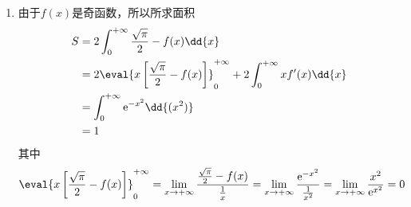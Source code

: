 \begin{solution}
\begin{enumerate}[(1)]
        \item 由于$f(x)$是奇函数，所以所求面积
              \begin{align*}
                  S
                   & = 2\int_0^{+\infty} \frac{\sqrt{\pi}}{2} - f(x)\dd{x}                                            \\
                   & = 2\eval{x\left[\frac{\sqrt{\pi}}{2} - f(x)\right]}_0^{+\infty} + 2\int_0^{+\infty} xf'(x)\dd{x} \\
                   & = \int_0^{+\infty} \mathrm{e}^{-x^2}\dd{(x^2)}                                                   \\
                   & = 1
              \end{align*}
              其中
              \[
                  \eval{x\left[\frac{\sqrt{\pi}}{2} - f(x)\right]}_0^{+\infty}
                  =
                  \lim_{x\to+\infty} \frac{\frac{\sqrt{\pi}}{2} - f(x)}{\frac{1}{x}}
                  =
                  \lim_{x\to+\infty} \frac{\mathrm{e}^{-x^2}}{\frac{1}{x^2}}
                  =
                  \lim_{x\to+\infty} \frac{x^2}{\mathrm{e}^{x^2}}
                  =
                  0
              \]
    \end{enumerate}
\end{solution}
